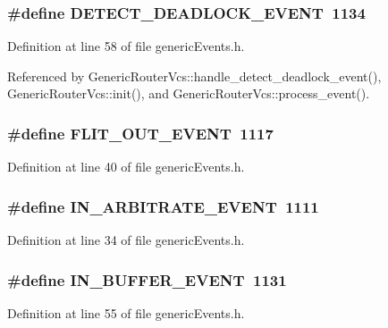 \subsubsection[{DETECT\_\-DEADLOCK\_\-EVENT}]{\setlength{\rightskip}{0pt plus 5cm}\#define DETECT\_\-DEADLOCK\_\-EVENT~1134}\label{genericEvents_8h_f1ade1cd5dced6eaf59be4859efbc14c}




Definition at line 58 of file genericEvents.h.

Referenced by GenericRouterVcs::handle\_\-detect\_\-deadlock\_\-event(), GenericRouterVcs::init(), and GenericRouterVcs::process\_\-event().
\subsubsection[{FLIT\_\-OUT\_\-EVENT}]{\setlength{\rightskip}{0pt plus 5cm}\#define FLIT\_\-OUT\_\-EVENT~1117}\label{genericEvents_8h_5497415141f14f47eaaea9b7af6bde4d}




Definition at line 40 of file genericEvents.h.
\subsubsection[{IN\_\-ARBITRATE\_\-EVENT}]{\setlength{\rightskip}{0pt plus 5cm}\#define IN\_\-ARBITRATE\_\-EVENT~1111}\label{genericEvents_8h_83c68574859911e22a1480f7c8431434}




Definition at line 34 of file genericEvents.h.
\subsubsection[{IN\_\-BUFFER\_\-EVENT}]{\setlength{\rightskip}{0pt plus 5cm}\#define IN\_\-BUFFER\_\-EVENT~1131}\label{genericEvents_8h_5a39832544743a9052be636e85033588}




Definition at line 55 of file genericEvents.h.
